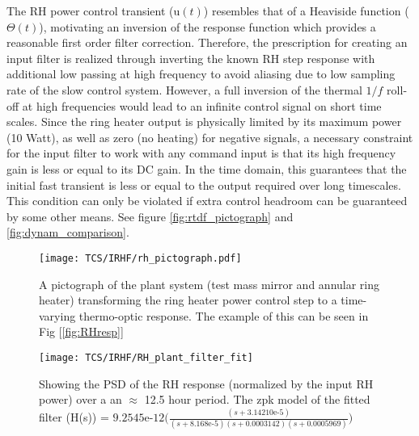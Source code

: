 The RH power control transient ($\mathrm{u}(t)$) resembles that of a Heaviside function ($\Theta(t)$), motivating an inversion of the response function which provides a reasonable first order filter correction. Therefore, the prescription for creating an input filter is realized through inverting the known RH step response with additional low passing at high frequency to avoid aliasing due to low sampling rate of the slow control system. However, a full inversion of the thermal $1/f$ roll-off at high frequencies would lead to an infinite control signal on short time scales. Since the ring heater output is physically limited by its maximum power (10 Watt), as well as zero (no heating) for negative signals, a necessary constraint for the input filter to work with any command input is that its high frequency gain is less or equal to its DC gain. In the time domain, this guarantees that the initial fast transient is less or equal to the output required over long timescales. This condition can only be violated if extra control headroom can be guaranteed by some other means. See figure \autoref{fig:rtdf_pictograph} and \autoref{fig:dynam_comparison}. 

\begin{figure}[H]
    \centering
    \texttt{[image: TCS/IRHF/rh\_pictograph.pdf]}
    \caption{A pictograph of the plant system (test mass mirror and annular ring heater) transforming the ring heater power control step to a time-varying thermo-optic response. The example of this can be seen in Fig [\ref{fig:RHresp}]}
    \label{fig:justplant}
\end{figure}

\begin{figure}[H]
    \centering
    \texttt{[image: TCS/IRHF/RH\_plant\_filter\_fit]}
    \caption{Showing the PSD of the RH response (normalized by the input RH power) over a an $\approx$ 12.5 hour period. The zpk model of the fitted filter (H(s)) = $9.2545\mathrm{e} \text{-}12 \Big(\frac{(s+3.14210\mathrm{e}\text{-}5)}{(s+8.168\mathrm{e}\text{-}5)(s+0.0003142)(s+0.0005969)}\Big)$}
    \label{fig:plant_v_fit}
\end{figure}

